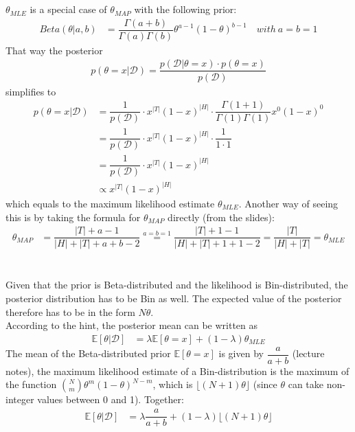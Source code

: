 \documentclass[11pt]{article}
\newcommand{\exercise}{\section{}}
\begin{document}
\exercise
$\theta_{MLE}$ is a special case of $\theta_{MAP}$ with the following prior:
\begin{align*}
	Beta(\theta|a,b) &= \dfrac{\Gamma(a+b)}{\Gamma(a)\Gamma(b)}\theta^{a-1}(1-\theta)^{b-1} \quad with\ a=b=1
\end{align*}
That way the posterior 
\begin{align*}
	p(\theta=x|\mathcal{D}) = \dfrac{p(\mathcal{D}|\theta=x) \cdot p(\theta=x)}{p(\mathcal{D})}
\end{align*}
simplifies to
\begin{align*}
	p(\theta=x|\mathcal{D}) &= \dfrac{1}{p(\mathcal{D})} \cdot x^{|T|} (1-x)^{|H|} \cdot \dfrac{\Gamma(1+1)}{\Gamma(1)\Gamma(1)} x^{0}(1-x)^{0} \\
	&= \dfrac{1}{p(\mathcal{D})} \cdot x^{|T|} (1-x)^{|H|} \cdot \dfrac{1}{1 \cdot 1} \\
	&= \dfrac{1}{p(\mathcal{D})} \cdot x^{|T|} (1-x)^{|H|} \\
	&\propto x^{|T|} (1-x)^{|H|}
\end{align*}
which equals to the maximum likelihood estimate $\theta_{MLE}$. Another way of seeing this is by taking the formula for $\theta_{MAP}$ directly (from the slides):
\begin{align*}
	\theta_{MAP} &= \dfrac{|T| + a - 1}{|H| + |T| + a + b - 2} \stackrel{a=b=1}{=} \dfrac{|T| + 1 - 1}{|H| + |T| + 1 + 1 - 2} = \dfrac{|T|}{|H| + |T|} = \theta_{MLE}
\end{align*}

\exercise
Given that the prior is Beta-distributed and the likelihood is Bin-distributed, the posterior distribution has to be Bin as well. The expected value of the posterior therefore has to be in the form $N\theta$.\\

\noindent According to the hint, the posterior mean can be written as
\begin{align*}
	\mathbb{E}[\theta|\mathcal{D}] &= \lambda\mathbb{E}[\theta = x] + (1-\lambda)\theta_{MLE}
\end{align*}
The mean of the Beta-distributed prior $\mathbb{E}[\theta = x]$ is given by $\dfrac{a}{a+b}$ (lecture notes), the maximum likelihood estimate of a Bin-distribution is the maximum of the function $\binom{N}{m}\theta^m(1-\theta)^{N-m}$, which is $\lfloor(N+1)\theta\rfloor$ (since $\theta$ can take non-integer values between 0 and 1). Together:
\begin{align*}
\mathbb{E}[\theta|\mathcal{D}] &= \lambda\dfrac{a}{a+b} + (1-\lambda)\lfloor(N+1)\theta\rfloor
\end{align*}
\end{document}
